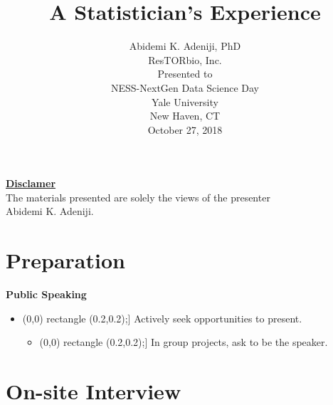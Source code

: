 \documentclass{beamer}
\newcommand{\filledsquare}{\tikz \draw[fill=darkblue] (0,0) rectangle (0.2,0.2);}
\begin{document}
	\title{A Statistician’s Experience}
	\author{Abidemi K. Adeniji, PhD\\ResTORbio, Inc.\\
	\bigskip
	\bigskip
		Presented to\\
		NESS-NextGen Data Science Day\\
		Yale University\\
		New Haven, CT\\
		October 27, 2018}
		\date[]{}
\frame{\titlepage}


\begin{frame}
\centering\textbf{\underline{Disclamer}}\\
The materials presented are solely the views of the presenter\\
Abidemi K. Adeniji.
\end{frame}


\section{Preparation}
\begin{frame}
\center
\textbf{Public Speaking}\\
\begin{itemize}
	\item[\filledsquare] Actively seek opportunities to present.
		\begin{itemize}
	\item[\filledsquare] In group projects, ask to be the speaker.
		\end{itemize}
\end{itemize}	
\end{frame}

\begin{frame}
\end{frame}

\section{On-site Interview}
\end{document}
